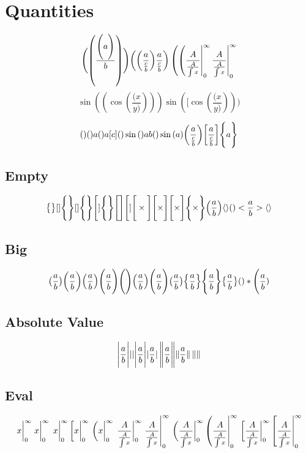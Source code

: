 \documentclass{article}
\begin{document}
\newpage
\section*{Quantities}

\[
  \pqty\Bigg{\pqty{\frac{\pqty\Bigg{a}}{b}}}
  \qty(  \qty(\frac{a}{\frac{c}{b}})\frac{a}{\frac{c}{b}})
    \eval(  \eval(\frac{A}{\frac{A}{\int x}}|_0^\infty\frac{A}{\frac{A}{\int x}}|_0^\infty
  \]
\[
  \sin((\cos({\frac{(x}{y)}})))
  \sin([\cos({\frac{(x}{y)}})))
\]



\[
  \quantity
  \quantity a
  \quantity\bigg a
  \quantity[c]
  \quantity\sin
  \qty\Bigg ab
  \quantity\bigg\sin
  \qty(a)
  \qty(\frac{a}{\frac{c}{b}})
  \qty[\frac{a}{\frac{c}{b}}]
  \qty\Bigg{a}
\]

\subsection*{Empty}

\[
  \qty\big{}[]
  \qty\Bigg{}[]
  \qty\Bigg{}\Bigg[]
  \qty\Bigg{}\qty\Bigg[]
  \Bigg[]
  \Bigg[ \times \Bigg]
  \Biggl[ \times \Biggr]
  \qty\Bigg[\times]
  \qty\Bigg{\times}
  \qty(\frac{a}{b})\langle\rangle
  \qty<\frac{a}{b}>\langle\rangle
\]

\subsection*{Big}

\[
  \quantity\big(\frac{a}{b})
  \quantity\bigg(\frac{a}{b})
  \quantity\Big(\frac{a}{b})
  \quantity\Bigg(\frac{a}{b})
  \pqty\Bigg{} 
  \pqty{\frac{a}{b}}
  \pqty\Bigg{\frac{a}{b}}
  \pqty\big{\frac{a}{b}}
  \Bqty{\frac{a}{b}}
  \Bqty\Bigg{\frac{a}{b}}
  \Bqty\big{\frac{a}{b}}
  \quantity*\Bigg(\frac{a}{b})
\]

\subsection*{Absolute Value}
\[
  \absolutevalue\Bigg{\frac{a}{b}}
  \absolutevalue{}
  \abs\Bigg{\frac{a}{b}}
  \abs*\Bigg{\frac{a}{b}}
  \norm\Bigg{\frac{a}{b}}
  \norm*\Bigg{\frac{a}{b}}
  \norm{}
\]


\newpage
\subsection*{Eval}

\[
  \evaluated{x}_0^\infty
  \eval{x}_0^\infty
  \eval*{x}_0^\infty
  \eval[x|_0^\infty
  \eval*(x|_0^\infty
  \eval*{\frac{A}{\frac{A}{\int x}}}_0^\infty
  \eval{\frac{A}{\frac{A}{\int x}}}_0^\infty
  \eval*(\frac{A}{\frac{A}{\int x}}|_0^\infty
  \eval(\frac{A}{\frac{A}{\int x}}|_0^\infty
  \eval*[\frac{A}{\frac{A}{\int x}}|_0^\infty
  \eval[\frac{A}{\frac{A}{\int x}}|_0^\infty
\]
\end{document}
